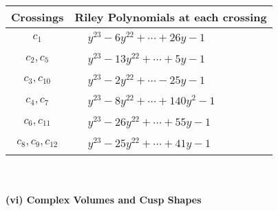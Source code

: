 \documentclass[1p]{elsarticle_modified}
\theoremstyle{definition}
\begin{document}
\begin{tabular}{m{50pt}|m{274pt}}
Crossings & \hspace{64pt}Riley Polynomials at each crossing \\
\hline $$\begin{aligned}c_{1}\end{aligned}$$&$\begin{aligned}
&y^{23}-6 y^{22}+\cdots+26 y-1
\end{aligned}$\\
\hline $$\begin{aligned}c_{2},c_{5}\end{aligned}$$&$\begin{aligned}
&y^{23}-13 y^{22}+\cdots+5 y-1
\end{aligned}$\\
\hline $$\begin{aligned}c_{3},c_{10}\end{aligned}$$&$\begin{aligned}
&y^{23}-2 y^{22}+\cdots-25 y-1
\end{aligned}$\\
\hline $$\begin{aligned}c_{4},c_{7}\end{aligned}$$&$\begin{aligned}
&y^{23}-8 y^{22}+\cdots+140 y^2-1
\end{aligned}$\\
\hline $$\begin{aligned}c_{6},c_{11}\end{aligned}$$&$\begin{aligned}
&y^{23}-26 y^{22}+\cdots+55 y-1
\end{aligned}$\\
\hline $$\begin{aligned}c_{8},c_{9},c_{12}\end{aligned}$$&$\begin{aligned}
&y^{23}-25 y^{22}+\cdots+41 y-1
\end{aligned}$\\
\hline
\end{tabular}\\~\\
\newpage\flushleft \textbf{(vi) Complex Volumes and Cusp Shapes}
\end{document}
